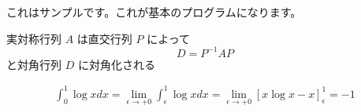 \documentclass[uplatex,a4paper,twocolumn,8pt,dvipdfmx]{jsarticle}
\begin{document}
これはサンプルです。これが基本のプログラムになります。

実対称行列 \(A\) は直交行列 \(P\) によって
\[
D = P^{-1} A P
\]
と対角行列 \(D\) に対角化される

\begin{align*}
    \begin{equation}
    \int_{0}^{1} \log x dx
    = \lim_{\epsilon \to +0} \int_{\epsilon}^{1} \log x dx
    = \lim_{\epsilon \to +0} [x \log x - x]_{\epsilon}^{1}
    = -1
    \end{equation}
\end{align*}
\end{document}
